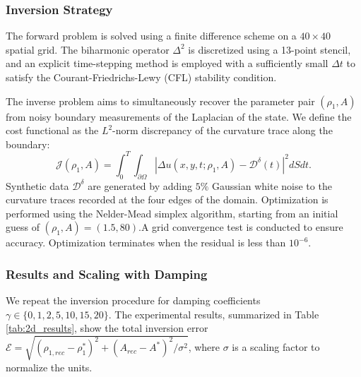 \documentclass[12pt,reqno]{amsart}
\numberwithin{equation}{section}
\begin{document}
	\subsubsection{Inversion Strategy}
	The forward problem is solved using a finite difference scheme on a $40 \times 40$ spatial grid. The biharmonic operator $\Delta^2$ is discretized using a 13-point stencil, and an explicit time-stepping method is employed with a sufficiently small $\Delta t$ to satisfy the Courant-Friedrichs-Lewy (CFL) stability condition.
	
	The inverse problem aims to simultaneously recover the parameter pair $(\rho_1, A)$ from noisy boundary measurements of the Laplacian of the state. We define the cost functional as the $L^2$-norm discrepancy of the curvature trace along the boundary:
	\begin{equation}
		\mathcal{J}(\rho_1, A) = \int_0^T \int_{\partial \Omega} \left| \Delta u(x, y, t; \rho_1, A) - \mathcal{D}^\delta(t) \right|^2 dS dt.
	\end{equation}
	Synthetic data $\mathcal{D}^\delta$ are generated by adding $5\%$ Gaussian white noise to the curvature traces recorded at the four edges of the domain. Optimization is performed using the Nelder-Mead simplex algorithm, starting from an initial guess of $(\rho_1, A) = (1.5, 80)$.A grid convergence test is conducted to ensure accuracy. Optimization terminates when the residual is less than \(10^{-6}\).
	
	\subsubsection{Results and Scaling with Damping}
	We repeat the inversion procedure for damping coefficients $\gamma \in \{0, 1, 2, 5, 10, 15, 20\}$. The experimental results, summarized in Table \ref{tab:2d_results}, show the total inversion error $\mathcal{E} = \sqrt{(\rho_{1, rec} - \rho_1^*)^2 + (A_{rec} - A^*)^2 / \sigma^2}$, where $\sigma$ is a scaling factor to normalize the units.
	
\end{document}
